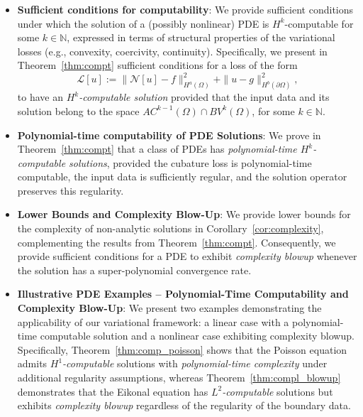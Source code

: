 \documentclass[pdflatex]{sn-jnl}%
\begin{document}
\begin{itemize}
    \item \textbf{Sufficient conditions for computability}: We provide sufficient conditions under which the solution of a (possibly nonlinear) PDE is $H^k$-computable for some $k \in \mathbb{N}$, expressed in terms of structural properties of the variational losses (e.g., convexity, coercivity, continuity). Specifically, we present in Theorem~\ref{thm:compt} sufficient conditions for a loss of the form 
    \begin{equation}
        \mathcal{L}[u]:=\|\mathcal{N}[u]-f\|_{H^a(\Omega)}^2+\|u-g\|_{H^b(\partial\Omega)}^2,
    \end{equation}
    to have an \emph{$H^k$-computable solution} provided that the input data and its solution belong to the space $AC^{k-1}(\Omega)\cap BV^k(\Omega)$, for some $k\in \mathbb{N}$. 
    \item \textbf{Polynomial-time computability of PDE Solutions}: We prove in Theorem~\ref{thm:compt} that a class of PDEs has \emph{polynomial-time $H^k$-computable solutions}, provided the cubature loss is polynomial-time computable, the input data is sufficiently regular, and the solution operator preserves this regularity.
    \item  \textbf{Lower Bounds and Complexity Blow-Up}: We provide lower bounds for the complexity of non-analytic solutions in Corollary~\ref{cor:complexity}, complementing the results from Theorem~\ref{thm:compt}. 
    Consequently, we provide sufficient conditions for a PDE to exhibit \emph{complexity blowup} whenever the solution has a super-polynomial convergence rate. 
    \item \textbf{Illustrative PDE Examples – Polynomial-Time Computability and Complexity Blow-Up}: We present two examples demonstrating the applicability of our variational framework: a linear case with a polynomial-time computable solution and a nonlinear case exhibiting complexity blowup. Specifically, Theorem~\ref{thm:comp_poisson} shows that the Poisson equation admits \emph{$H^1$-computable} solutions with \emph{polynomial-time complexity} under additional regularity assumptions, whereas Theorem~\ref{thm:compl_blowup} demonstrates that the Eikonal equation has \emph{$L^2$-computable} solutions but exhibits \emph{complexity blowup} regardless of the regularity of the boundary data.

\end{itemize}
\end{document}
